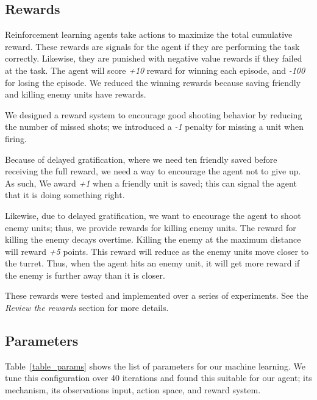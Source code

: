 \documentclass[conference]{IEEEtran}
\begin{document}
\subsection{Rewards}

Reinforcement learning agents take actions to maximize the total cumulative reward. These rewards are signals for the agent if they are performing the task correctly. Likewise, they are punished with negative value rewards if they failed at the task. The agent will score \textit{+10} reward for winning each episode, and \textit{-100} for losing the episode. We reduced the winning rewards because saving friendly and killing enemy units have rewards. 

We designed a reward system to encourage good shooting behavior by reducing the number of missed shots; we introduced a \textit{-1} penalty for missing a unit when firing.

Because of delayed gratification, where we need ten friendly saved before receiving the full reward, we need a way to encourage the agent not to give up. As such, We award \textit{+1} when a friendly unit is saved; this can signal the agent that it is doing something right.

Likewise, due to delayed gratification, we want to encourage the agent to shoot enemy units; thus, we provide rewards for killing enemy units. The reward for killing the enemy decays overtime. Killing the enemy at the maximum distance will reward \textit{+5} points. This reward will reduce as the enemy units move closer to the turret. Thus, when the agent hits an enemy unit, it will get more reward if the enemy is further away than it is closer.

These rewards were tested and implemented over a series of experiments. See the \textit{Review the rewards} section for more details.

\subsection{Parameters}

Table~\ref{table_params} shows the list of parameters for our machine learning. We tune this configuration over 40 iterations and found this suitable for our agent; its mechanism, its observations input, action space, and reward system.
\end{document}
